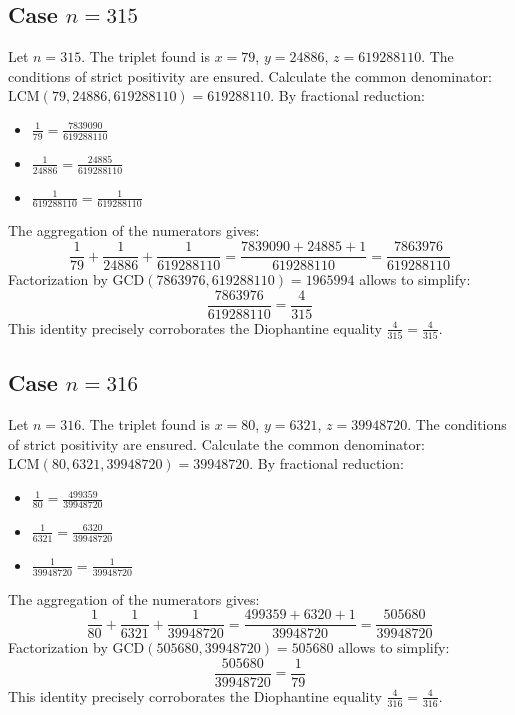 \documentclass[11pt,a4paper]{article}
\begin{document}
\subsection{Case $n = 315$}
Let $n = 315$. The triplet found is $x = 79$, $y = 24886$, $z = 619288110$.
The conditions of strict positivity are ensured.
Calculate the common denominator: $\text{LCM}(79, 24886, 619288110) = 619288110$.
By fractional reduction:
\begin{itemize}
    \item $\frac{1}{79} = \frac{7839090}{619288110}$
    \item $\frac{1}{24886} = \frac{24885}{619288110}$
    \item $\frac{1}{619288110} = \frac{1}{619288110}$
\end{itemize}
The aggregation of the numerators gives:
$$ \frac{1}{79} + \frac{1}{24886} + \frac{1}{619288110} = \frac{7839090 + 24885 + 1}{619288110} = \frac{7863976}{619288110} $$
Factorization by $\text{GCD}(7863976, 619288110) = 1965994$ allows to simplify:
$$ \frac{7863976}{619288110} = \frac{4}{315} $$
This identity precisely corroborates the Diophantine equality $\frac{4}{315} = \frac{4}{315}$.

\subsection{Case $n = 316$}
Let $n = 316$. The triplet found is $x = 80$, $y = 6321$, $z = 39948720$.
The conditions of strict positivity are ensured.
Calculate the common denominator: $\text{LCM}(80, 6321, 39948720) = 39948720$.
By fractional reduction:
\begin{itemize}
    \item $\frac{1}{80} = \frac{499359}{39948720}$
    \item $\frac{1}{6321} = \frac{6320}{39948720}$
    \item $\frac{1}{39948720} = \frac{1}{39948720}$
\end{itemize}
The aggregation of the numerators gives:
$$ \frac{1}{80} + \frac{1}{6321} + \frac{1}{39948720} = \frac{499359 + 6320 + 1}{39948720} = \frac{505680}{39948720} $$
Factorization by $\text{GCD}(505680, 39948720) = 505680$ allows to simplify:
$$ \frac{505680}{39948720} = \frac{1}{79} $$
This identity precisely corroborates the Diophantine equality $\frac{4}{316} = \frac{4}{316}$.
\end{document}
